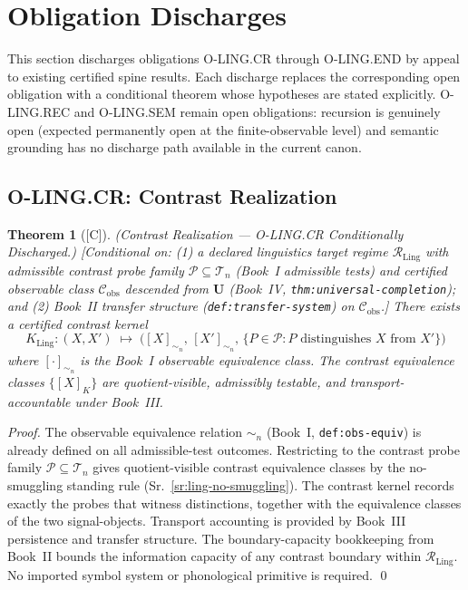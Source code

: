 \documentclass[12pt,oneside]{amsbook}
\theoremstyle{plain}
\newtheorem{theorem}{Theorem}[section]
\theoremstyle{definition}
\theoremstyle{remark}
\newcommand{\status}[1]{\textup{[#1]}}
\begin{document}
\section{Obligation Discharges}\label{sec:ling-discharges}

This section discharges obligations O-LING.CR through O-LING.END by
appeal to existing certified spine results. Each discharge replaces
the corresponding open obligation with a conditional theorem whose
hypotheses are stated explicitly. O-LING.REC and O-LING.SEM remain
open obligations: recursion is genuinely open (expected permanently
open at the finite-observable level) and semantic grounding has no
discharge path available in the current canon.

\subsection{O-LING.CR: Contrast Realization}\label{sec:ling-CR-discharge}

\begin{theorem}[\status{C}]\label{thm:ling-CR-discharged}
\textup{(Contrast Realization --- O-LING.CR Conditionally Discharged.)}
\textup{[Conditional on: (1) a declared linguistics target regime
$\mathcal{R}_{\mathrm{Ling}}$ with admissible contrast probe family
$\mathcal{P} \subseteq \mathcal{T}_n$ (Book~I admissible tests) and
certified observable class $\mathcal{C}_{\mathrm{obs}}$ descended from
$\mathbf{U}$ (Book~IV, \texttt{thm:universal-completion}); and (2)
Book~II transfer structure (\texttt{def:transfer-system}) on
$\mathcal{C}_{\mathrm{obs}}$.]}
There exists a certified contrast kernel
\[
 K_{\mathrm{Ling}} : (X, X') \;\mapsto\;
 \bigl([X]_{\sim_n},\, [X']_{\sim_n},\,
 \{P \in \mathcal{P} : P \text{ distinguishes } X \text{ from } X'\}\bigr)
\]
where $[\cdot]_{\sim_n}$ is the Book~I observable equivalence class.
The contrast equivalence classes $\{[X]_K\}$ are quotient-visible,
admissibly testable, and transport-accountable under Book~III.
\end{theorem}

\begin{proof}
The observable equivalence relation $\sim_n$ (Book~I,
\texttt{def:obs-equiv}) is already defined on all admissible-test
outcomes. Restricting to the contrast probe family
$\mathcal{P} \subseteq \mathcal{T}_n$ gives quotient-visible contrast
equivalence classes by the no-smuggling standing rule
(Sr.~\ref{sr:ling-no-smuggling}). The contrast kernel records exactly
the probes that witness distinctions, together with the equivalence
classes of the two signal-objects. Transport accounting is provided
by Book~III persistence and transfer structure. The
boundary-capacity bookkeeping from Book~II bounds the information
capacity of any contrast boundary within $\mathcal{R}_{\mathrm{Ling}}$.
No imported symbol system or phonological primitive is required.
\qed
\end{proof}
\end{document}
